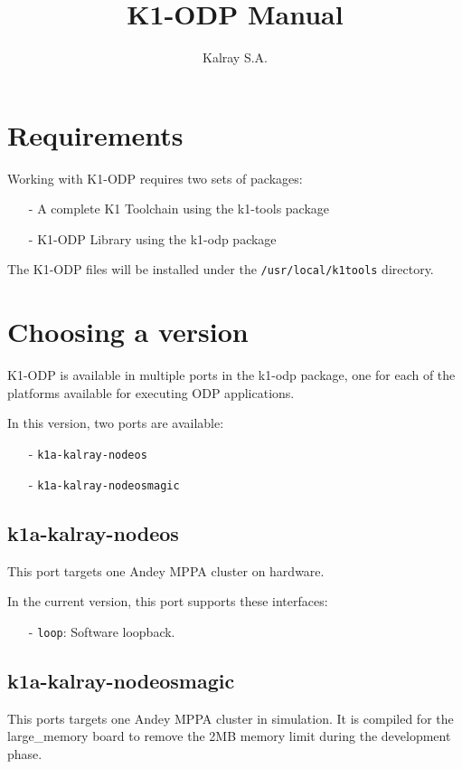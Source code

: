 \documentclass{trkalray}
\author{%
Kalray S.A.\autref{1}
}
\institute{%
\autlabel{1} \email{support@kalray.eu},
Kalray S.A.
}
\title{K1-ODP Manual}
\begin{document}
\maketitle

\tableofcontents

\newpage
\section{Requirements}

Working with K1-ODP requires two sets of packages:
\begin{itemize}
\item[-]{A complete K1 Toolchain using the k1-tools package}
\item[-]{K1-ODP Library using the k1-odp package}
\end{itemize}

The K1-ODP files will be installed under the
\texttt{/usr/local/k1tools} directory.

\section{Choosing a version}
K1-ODP is available in multiple ports in the k1-odp package, one for
each of the platforms available for executing ODP applications.

In this version, two ports are available:
\begin{itemize}
\item[-]{\texttt{k1a-kalray-nodeos}}
\item[-]{\texttt{k1a-kalray-nodeosmagic}}
\end{itemize}

\subsection{k1a-kalray-nodeos}

This port targets one Andey MPPA cluster on hardware.

In the current version, this port supports these interfaces:
\begin{itemize}
\item[-]{\texttt{loop}: Software loopback.}
\end{itemize}

\subsection{k1a-kalray-nodeosmagic}

This ports targets one Andey MPPA cluster in simulation. It is
compiled for the large\_memory board to remove the 2MB memory limit
during the development phase.
\end{document}
